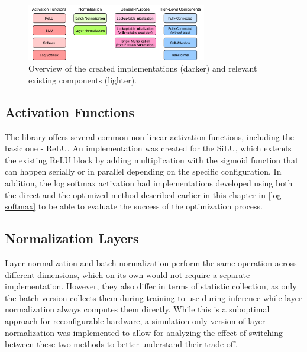 \begin{figure}[hpt!]
  \centering
  \includegraphics[trim={0cm 0cm 0cm 0cm}, clip, width=0.7\textwidth, center]{quantization/hls4ml_blocks.pdf}
  \caption{Overview of the created implementations (darker) and relevant existing components (lighter).}
  \label{fig:hls4ml-contributions}
\end{figure}


\subsection{Activation Functions}
The library offers several common non-linear activation functions, including the basic one - ReLU. An implementation was created for the SiLU, which extends the existing ReLU block by adding multiplication with the sigmoid function that can happen serially or in parallel depending on the specific configuration. In addition, the log softmax activation had implementations developed using both the direct and the optimized method described earlier in this chapter in \cref{log-softmax} to be able to evaluate the success of the optimization process.

\subsection{Normalization Layers}
Layer normalization and batch normalization perform the same operation across different dimensions, which on its own would not require a separate implementation. However, they also differ in terms of statistic collection, as only the batch version collects them during training to use during inference while layer normalization always computes them directly. While this is a suboptimal approach for reconfigurable hardware, a simulation-only version of layer normalization was implemented to allow for analyzing the effect of switching between these two methods to better understand their trade-off.

